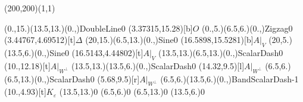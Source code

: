 \unitlength=1bp%

\begin{feynartspicture}(200,200)(1,1)

\FADiagram{}
\FAProp(0.,15.)(13.5,13.)(0.,){DoubleLine}{0}
\FALabel(3.37315,15.28)[b]{$O$}
\FAProp(0.,5.)(6.5,6.)(0.,){Zigzag}{0}
\FALabel(3.44767,4.69512)[t]{$\Delta$}
\FAProp(20,15.)(6.5,13.)(0.,){Sine}{0}
\FALabel(16.5898,15.5281)[b]{$A|_V$}
\FAProp(20,5.)(13.5,6.)(0.,){Sine}{0}
\FALabel(16.5143,4.44802)[t]{$A|_V$}
\FAProp(13.5,13.)(6.5,13.)(0.,){ScalarDash}{0}
\FALabel(10.,12.18)[t]{$A|_{W^\perp}$}
\FAProp(13.5,13.)(13.5,6.)(0.,){ScalarDash}{0}
\FALabel(14.32,9.5)[l]{$A|_{W^\perp}$}
\FAProp(6.5,6.)(6.5,13.)(0.,){ScalarDash}{0}
\FALabel(5.68,9.5)[r]{$A|_{W^\perp}$}
\FAProp(6.5,6.)(13.5,6.)(0.,){BandScalarDash}{-1}
\FALabel(10.,4.93)[t]{$K_\varepsilon$}
\FAVert(13.5,13.){0}
\FAVert(6.5,6.){0}
\FAVert(6.5,13.){0}
\FAVert(13.5,6.){0}
\end{feynartspicture}

